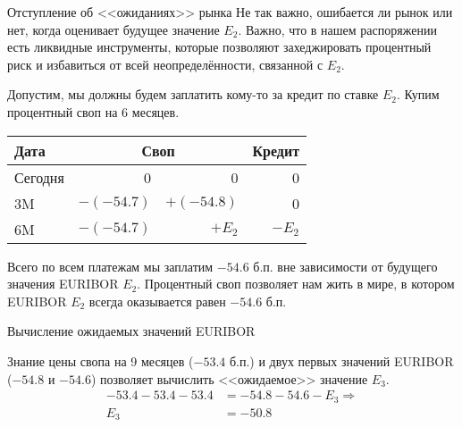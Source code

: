 \documentclass{beamer}
\begin{document}
\begin{frame}{Отступление об <<ожиданиях>> рынка}
\justify
Не так важно, ошибается ли рынок или нет, когда оценивает будущее значение $E_2$. Важно, что в нашем распоряжении есть ликвидные инструменты, которые позволяют захеджировать процентный риск и избавиться от всей неопределённости, связанной с $E_2$.

\justify
Допустим, мы должны будем заплатить кому-то за кредит по ставке $E_2$. Купим процентный своп на 6 месяцев.
\centering
\begin{tabular}{l|r|r|r}
Дата    & \multicolumn{2}{c|}{Своп} & Кредит \\ \hline
Сегодня &          0  &  0            & 0 \\
3M      & $-(-54.7)$  &  $+(-54.8)$   & 0 \\
6M      & $-(-54.7)$  &  $+E_2$       & $-E_2$
\end{tabular}

\justify
Всего по всем платежам мы заплатим $-54.6$ б.п. вне зависимости от будущего значения EURIBOR $E_2$. Процентный своп позволяет нам жить в мире, в котором EURIBOR $E_2$ всегда оказывается равен $-54.6$ б.п.
\end{frame}



\begin{frame}{Вычисление ожидаемых значений EURIBOR}
\centering
{}

\justify
Знание цены свопа на 9 месяцев ($-53.4$ б.п.) и двух первых значений EURIBOR ($-54.8$ и $-54.6$) позволяет вычислить <<ожидаемое>> значение $E_3$.
\begin{align*}
-53.4 - 53.4 - 53.4 &= -54.8 - 54.6 - E_3 \Rightarrow \\
E_3 &= -50.8
\end{align*}
\end{frame}
\end{document}
